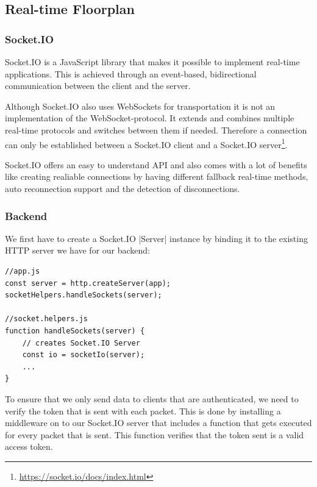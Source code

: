 \subsection{Real-time Floorplan}
\label{Real-time Floorplan}

\subsubsection{Socket.IO}
\label{Socket.IO}

Socket.IO is a JavaScript library that makes it possible to implement real-time applications. This is achieved through an event-based, bidirectional communication between the client and the server. 

Although Socket.IO also uses WebSockets for transportation it is not an implementation of the WebSocket-protocol. It extends and combines multiple real-time protocols and switches between them if needed. Therefore a connection can only be established between a Socket.IO client and a Socket.IO server\footnote{\url{https://socket.io/docs/index.html}}.

Socket.IO offers an easy to understand API and also comes with a lot of benefits like creating realiable connections by having different fallback real-time methods, auto reconnection support and the detection of disconnections.

\subsubsection{Backend}
\label{Backend}

We first have to create a Socket.IO |Server|\cite{socketio:server} instance by binding it to the existing HTTP server we have for our backend:

\begin{lstlisting}[label=createSocketIOServer]
//app.js
const server = http.createServer(app);
socketHelpers.handleSockets(server);

//socket.helpers.js
function handleSockets(server) {
	// creates Socket.IO Server
    const io = socketIo(server);
    ...
}
\end{lstlisting}

To ensure that we only send data to clients that are authenticated, we need to verify the token that is sent with each packet. This is done by installing a middleware on to our Socket.IO server that includes a function that gets executed for every packet that is sent. This function verifies that the token sent is a valid access token.

